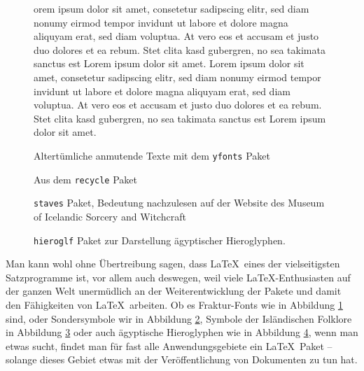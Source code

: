 \begin{figure}[h]
\centering
\begin{minipage}[b]{0.5\textwidth}
\frakfamily
{}orem ipsum dolor sit amet, consetetur sadipscing elitr, sed diam nonumy eirmod tempor invidunt ut labore et dolore magna aliquyam erat, sed diam voluptua. At vero eos et accusam et justo duo dolores et ea rebum. Stet clita kasd gubergren, no sea takimata sanctus est Lorem ipsum dolor sit amet. Lorem ipsum dolor sit amet, consetetur sadipscing elitr, sed diam nonumy eirmod tempor invidunt ut labore et dolore magna aliquyam erat, sed diam voluptua. At vero eos et accusam et justo duo dolores et ea rebum. Stet clita kasd gubergren, no sea takimata sanctus est Lorem ipsum dolor sit amet.
\end{minipage}
\caption{Altertümliche anmutende Texte mit dem \texttt{yfonts} Paket}
\label{fig:lorem}
\end{figure}

\begin{figure}[h]
\centering
\recycle
\Recycle
\RECYCLE
\caption{Aus dem \texttt{recycle} Paket}
\label{fig:recycle}
\end{figure}

\begin{figure}[h]
\centering
{\fontsize{64}{66} \staveXLV \staveXLIII \staveXX}
\caption{\texttt{staves} Paket, Bedeutung nachzulesen auf der Website des Museum of Icelandic Sorcery and Witchcraft}
\label{fig:staves}
\end{figure}

\begin{figure}[h]
\centering
{\fontsize{48}{50} }
\caption{\texttt{hieroglf} Paket zur Darstellung ägyptischer Hieroglyphen.}
\label{fig:hiero}
\end{figure}

Man kann wohl ohne Übertreibung sagen, dass \LaTeX\ eines der vielseitigsten Satzprogramme ist, vor allem auch deswegen, weil viele \LaTeX-Enthusiasten auf der ganzen Welt unermüdlich an der Weiterentwicklung der Pakete und damit den Fähigkeiten von \LaTeX\ arbeiten. Ob es Fraktur-Fonts wie in Abbildung \ref{fig:lorem} sind, oder Sondersymbole wir in Abbildung \ref{fig:recycle}, Symbole der Isländischen Folklore in Abbildung \ref{fig:staves} oder auch ägyptische Hieroglyphen wie in Abbildung \ref{fig:hiero}, wenn man etwas sucht, findet man für fast alle Anwendungsgebiete ein \LaTeX\ Paket -- solange dieses Gebiet etwas mit der Veröffentlichung von Dokumenten zu tun hat. 

